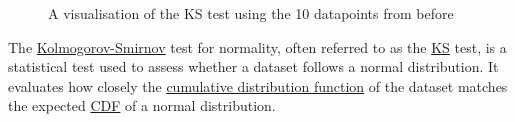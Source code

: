 \documentclass[
  a4paper,
]{scrbook}
\begin{document}
\begin{figure}[H]


\caption{\label{fig-ks-smpl}A visualisation of the KS test using the 10
datapoints from before}

\end{figure}%

The \hyperref[KS]{Kolmogorov-Smirnov} test for normality, often referred
to as the \hyperref[KS]{KS} test, is a statistical test used to assess
whether a dataset follows a normal distribution. It evaluates how
closely the \hyperref[cdf]{cumulative distribution function} of the
dataset matches the expected \hyperref[cdf]{CDF} of a normal
distribution.
\end{document}

